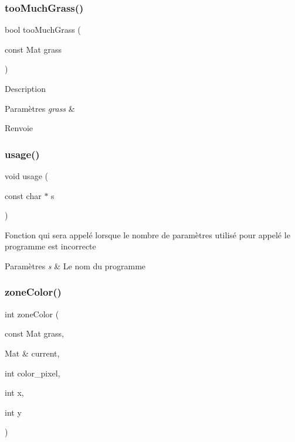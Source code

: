 \subsubsection{\texorpdfstring{too\+Much\+Grass()}{tooMuchGrass()}}
{\footnotesize\ttfamily bool too\+Much\+Grass (\begin{DoxyParamCaption}\item[{const Mat}]{grass }\end{DoxyParamCaption})}

Description 
\begin{DoxyParams}{Paramètres}
{\em grass} & \\
\hline
\end{DoxyParams}
\begin{DoxyReturn}{Renvoie}

\end{DoxyReturn}
\mbox{\label{video-player_8cpp_a6d8fa02fe70636ca21ee1ffef9de4880}} 
\subsubsection{\texorpdfstring{usage()}{usage()}}
{\footnotesize\ttfamily void usage (\begin{DoxyParamCaption}\item[{const char $\ast$}]{s }\end{DoxyParamCaption})}

Fonction qui sera appelé lorsque le nombre de paramètres utilisé pour appelé le programme est incorrecte 
\begin{DoxyParams}{Paramètres}
{\em s} & Le nom du programme \\
\hline
\end{DoxyParams}
\mbox{\label{video-player_8cpp_ac89fd49fa60c43491222d0a4f4e0770b}} 
\subsubsection{\texorpdfstring{zone\+Color()}{zoneColor()}}
{\footnotesize\ttfamily int zone\+Color (\begin{DoxyParamCaption}\item[{const Mat}]{grass,  }\item[{Mat \&}]{current,  }\item[{int}]{color\+\_\+pixel,  }\item[{int}]{x,  }\item[{int}]{y }\end{DoxyParamCaption})}

